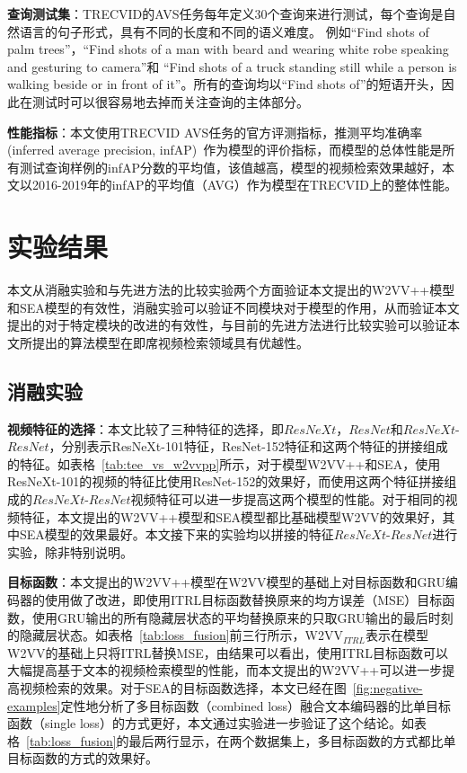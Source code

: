\textbf{查询测试集}：TRECVID的AVS任务每年定义30个查询来进行测试，每个查询是自然语言的句子形式，具有不同的长度和不同的语义难度。
例如“Find shots of palm trees”，“Find shots of a man with beard and wearing white robe speaking and gesturing to camera”和
“Find shots of a truck standing still while a person is walking beside or in front of it”。所有的查询均以“Find shots of”的短语开头，因此在测试时可以很容易地去掉而关注查询的主体部分。

\textbf{性能指标}：本文使用TRECVID AVS任务的官方评测指标，推测平均准确率(inferred average precision, infAP)~\cite{awad2016trecvid,awad2017trecvid,awad2018trecvid,awad2019trecvid}作为模型的评价指标，而模型的总体性能是所有测试查询样例的infAP分数的平均值，该值越高，模型的视频检索效果越好，本文以2016-2019年的infAP的平均值（AVG）作为模型在TRECVID上的整体性能。


\section{实验结果}
本文从消融实验和与先进方法的比较实验两个方面验证本文提出的W2VV++模型和SEA模型的有效性，消融实验可以验证不同模块对于模型的作用，从而验证本文提出的对于特定模块的改进的有效性，与目前的先进方法进行比较实验可以验证本文所提出的算法模型在即席视频检索领域具有优越性。

\subsection{消融实验}
\textbf{视频特征的选择}：本文比较了三种特征的选择，即$ResNeXt$，$ResNet$和$ResNeXt$-$ResNet$，分别表示ResNeXt-101特征，ResNet-152特征和这两个特征的拼接组成的特征。如表格~\ref{tab:tee_vs_w2vvpp}所示，对于模型W2VV++和SEA，使用ResNeXt-101的视频的特征比使用ResNet-152的效果好，而使用这两个特征拼接组成的$ResNeXt$-$ResNet$视频特征可以进一步提高这两个模型的性能。对于相同的视频特征，本文提出的W2VV++模型和SEA模型都比基础模型W2VV的效果好，其中SEA模型的效果最好。本文接下来的实验均以拼接的特征$ResNeXt$-$ResNet$进行实验，除非特别说明。



\textbf{目标函数}：本文提出的W2VV++模型在W2VV模型的基础上对目标函数和GRU编码器的使用做了改进，即使用ITRL目标函数替换原来的均方误差（MSE）目标函数，使用GRU输出的所有隐藏层状态的平均替换原来的只取GRU输出的最后时刻的隐藏层状态。如表格~\ref{tab:loss_fusion}前三行所示，W2VV$_{ITRL}$表示在模型W2VV的基础上只将ITRL替换MSE，由结果可以看出，使用ITRL目标函数可以大幅提高基于文本的视频检索模型的性能，而本文提出的W2VV++可以进一步提高视频检索的效果。对于SEA的目标函数选择，本文已经在图~\ref{fig:negative-examples}定性地分析了多目标函数（combined loss）融合文本编码器的比单目标函数（single loss）的方式更好，本文通过实验进一步验证了这个结论。如表格~\ref{tab:loss_fusion}的最后两行显示，在两个数据集上，多目标函数的方式都比单目标函数的方式的效果好。

